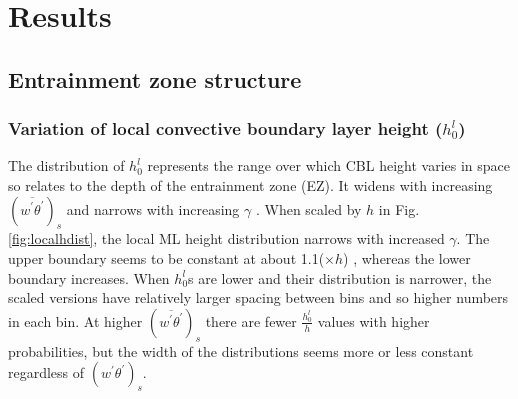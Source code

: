 \documentclass[referee]{svjour3}
\begin{document}
\section{Results}
\subsection{Entrainment zone structure}

\subsubsection{Variation of local convective boundary layer height ($h_{0}^{l}$)}
\label{subsubsec:loccblh}


The distribution of $h_{0}^{l}$ represents the range over which CBL height varies in space so relates to the depth of the entrainment zone (EZ).  It widens with increasing $(\overline{w^{'}\theta^{'}})_{s}$ and narrows with increasing $\gamma$ \citep{NChap14}.  When scaled by $h$ in Fig. \ref{fig:localhdist}, the local ML height distribution narrows with increased $\gamma$.  The upper boundary seems to be constant at about 1.1($\times h$) , whereas the lower boundary increases.  When $h_{0}^{l}$s are lower and their distribution is narrower, the scaled versions have relatively larger spacing between bins and so higher numbers in each bin. At higher $(\overline{w^{'}\theta^{'}})_{s}$ there are fewer $\frac{h_{0}^{l}}{h}$ values with higher probabilities, but the width of the distributions seems more or less constant regardless of $(w^{'}\theta^{'})_{s}$.\\
\end{document}
